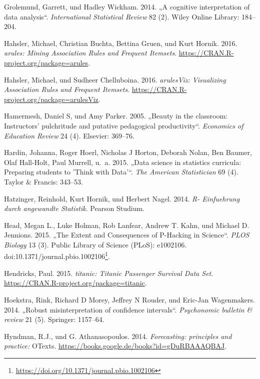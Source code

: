 \documentclass[12pt,ngerman,]{book}
\let\rmarkdownfootnote\footnote%
\def\footnote{\protect\rmarkdownfootnote}
\renewcommand{\href}[2]{#2\footnote{\url{#1}}}
\theoremstyle{definition}
\theoremstyle{definition}
\theoremstyle{remark}
\begin{document}
\hypertarget{ref-grolemund2014cognitive}{}
Grolemund, Garrett, und Hadley Wickham. 2014. „A cognitive
interpretation of data analysis``. \emph{International Statistical
Review} 82 (2). Wiley Online Library: 184--204.

\hypertarget{ref-R-arules}{}
Hahsler, Michael, Christian Buchta, Bettina Gruen, und Kurt Hornik.
2016. \emph{arules: Mining Association Rules and Frequent Itemsets}.
\url{https://CRAN.R-project.org/package=arules}.

\hypertarget{ref-R-arulesViz}{}
Hahsler, Michael, und Sudheer Chelluboina. 2016. \emph{arulesViz:
Visualizing Association Rules and Frequent Itemsets}.
\url{https://CRAN.R-project.org/package=arulesViz}.

\hypertarget{ref-hamermesh2005beauty}{}
Hamermesh, Daniel S, und Amy Parker. 2005. „Beauty in the classroom:
Instructors' pulchritude and putative pedagogical productivity``.
\emph{Economics of Education Review} 24 (4). Elsevier: 369--76.

\hypertarget{ref-hardin2015data}{}
Hardin, Johanna, Roger Hoerl, Nicholas J Horton, Deborah Nolan, Ben
Baumer, Olaf Hall-Holt, Paul Murrell, u.~a. 2015. „Data science in
statistics curricula: Preparing students to 'Think with Data'``.
\emph{The American Statistician} 69 (4). Taylor \& Francis: 343--53.

\hypertarget{ref-Hatzinger}{}
Hatzinger, Reinhold, Kurt Hornik, und Herbert Nagel. 2014. \emph{R-
Einfuehrung durch angewandte Statistik}. Pearson Studium.

\hypertarget{ref-Head2015}{}
Head, Megan L., Luke Holman, Rob Lanfear, Andrew T. Kahn, und Michael D.
Jennions. 2015. „The Extent and Consequences of P-Hacking in Science``.
\emph{PLOS Biology} 13 (3). Public Library of Science (PLoS): e1002106.
doi:\href{https://doi.org/10.1371/journal.pbio.1002106}{10.1371/journal.pbio.1002106}.

\hypertarget{ref-R-titanic}{}
Hendricks, Paul. 2015. \emph{titanic: Titanic Passenger Survival Data
Set}. \url{https://CRAN.R-project.org/package=titanic}.

\hypertarget{ref-hoekstra2014robust}{}
Hoekstra, Rink, Richard D Morey, Jeffrey N Rouder, und Eric-Jan
Wagenmakers. 2014. „Robust misinterpretation of confidence intervals``.
\emph{Psychonomic bulletin \& review} 21 (5). Springer: 1157--64.

\hypertarget{ref-hyndman2014forecasting}{}
Hyndman, R.J., und G. Athanasopoulos. 2014. \emph{Forecasting:
principles and practice:} OTexts.
\url{https://books.google.de/books?id=gDuRBAAAQBAJ}.
\end{document}
